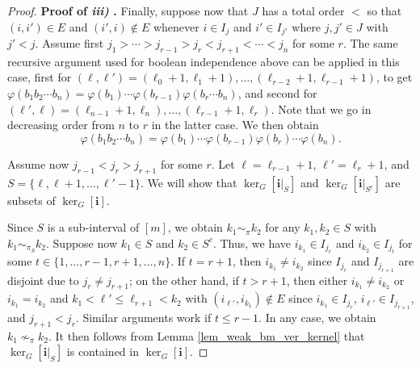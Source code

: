 \documentclass[10pt,a4paper]{amsart}
\begin{document}
\begin{proof}
	
	\noindent \textbf{Proof of \emph{iii)}
		.} Finally, suppose now that $J$ has a total order $<$ so that $(i,i') \in E$ and $(i',i) \notin E$  whenever $i \in I_{j}$ and $i' \in I_{j'}$ where $j,j' \in J$ with $j' < j$. 
	Assume first $ j_1 > \cdots > j_{r-1} > j_r < j_{r+1} < \cdots < j_n$ for some $r$. 
	The same recursive argument used for boolean independence above can be applied in this case, first for $(\ell,\ell') =(\ell_0+1,\ell_1+1),\ldots,(\ell_{r-2}+1,\ell_{r-1}+1)$, to get $\varphi(b_1 b_2 \cdots b_n)  = \varphi(b_1)  \cdots \varphi(b_{r-1}) \varphi(b_r \cdots b_n)$, and second for $(\ell',\ell) =(\ell_{n-1}+1,\ell_n),\ldots,(\ell_{r-1}+1,\ell_{r})$.
	Note that we go in decreasing order from $n$ to $r$ in the latter case. 
	We then obtain $$\varphi(b_1 b_2 \cdots b_n)  = \varphi(b_1)  \cdots \varphi(b_{r-1}) \varphi(b_r)  \cdots \varphi(b_n).$$ 
	
	Assume now $j_{r-1} < j_r > j_{r+1}$ for some $r$. 
	Let $\ell = \ell_{r-1}+1$, $\ell' = \ell_r+1$, and $S = \{ \ell, \ell+1, \ldots, \ell'-1 \}$. 
	We will show that $\ker_G[\bm{i}|_S]$ and $\ker_G[\bm{i}|_{S^c}]$ are subsets of $\ker_G[\bm{i}]$. 
	
	Since $S$ is a sub-interval of $[m]$, we obtain $k_1 \sim_{\pi} k_2$ for any $k_1,k_2 \in S$ with  $k_1 \sim_{\pi_S} k_2$. 
	Suppose now $k_1 \in S$ and $k_2 \in S^c$. 
	Thus, we have $i_{k_1} \in I_{j_r}$ and $i_{k_2} \in I_{j_t}$ for some $ t \in \{1,\ldots,r-1,r+1,\ldots,n\}$.    
	If $t=r+1$, then $i_{k_1} \neq i_{k_2}$ since $I_{j_r}$ and $I_{j_{r+1}}$ are disjoint due to $j_r \neq j_{r+1}$;
	on the other hand, if $t>r+1$, then either $i_{k_1} \neq i_{k_2}$ or $i_{k_1} = i_{k_2}$ and $k_1 < \ell' \leq \ell_{r+1} < k_2$ with  $(i_{\ell'},i_{k_1}) \notin E$ since $i_{k_1} \in I_{j_r}$, $i_{\ell'} \in I_{j_{r+1}}$, and $j_{r+1} < j_{r}$. 
	Similar arguments work if $t \leq r-1$. 
	In any case, we obtain $k_1 \nsim_{\pi} k_2$. 
	It then follows from Lemma \ref{lem_weak_bm_ver_kernel} that $\ker_G[\bm{i}|_S]$ is contained in $\ker_G[\bm{i}]$. 
	

\end{proof}
\end{document}
